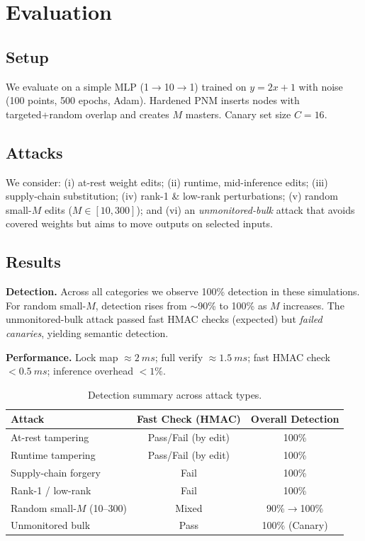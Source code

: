 \documentclass[11pt]{article}
\begin{document}
\section{Evaluation}
\subsection{Setup}
We evaluate on a simple MLP (1$\rightarrow$10$\rightarrow$1) trained on $y=2x+1$ with noise (100 points, 500 epochs, Adam). Hardened PNM inserts nodes with targeted+random overlap and creates $M$ masters. Canary set size $C=16$.

\subsection{Attacks}
We consider: (i) at-rest weight edits; (ii) runtime, mid-inference edits; (iii) supply-chain substitution; (iv) rank-1 \& low-rank perturbations; (v) random small-$M$ edits ($M\in[10,300]$); and (vi) an \emph{unmonitored-bulk} attack that avoids covered weights but aims to move outputs on selected inputs.

\subsection{Results}
\textbf{Detection.} Across all categories we observe 100\% detection in these simulations. For random small-$M$, detection rises from $\sim$90\% to 100\% as $M$ increases. The unmonitored-bulk attack passed fast HMAC checks (expected) but \emph{failed canaries}, yielding semantic detection.

\textbf{Performance.} Lock map $\approx\SI{2}{ms}$; full verify $\approx\SI{1.5}{ms}$; fast HMAC check $<\SI{0.5}{ms}$; inference overhead $<1\%$.

\begin{table}[h]
\centering
\caption{Detection summary across attack types.}
\begin{tabular}{lcc}
\toprule
Attack & Fast Check (HMAC) & Overall Detection \\
\midrule
At-rest tampering & Pass/Fail (by edit) & 100\% \\
Runtime tampering & Pass/Fail (by edit) & 100\% \\
Supply-chain forgery & Fail & 100\% \\
Rank-1 / low-rank & Fail & 100\% \\
Random small-$M$ (10--300) & Mixed & 90\%$\rightarrow$100\% \\
Unmonitored bulk & Pass & 100\% (Canary) \\
\bottomrule
\end{tabular}
\end{table}
\end{document}
